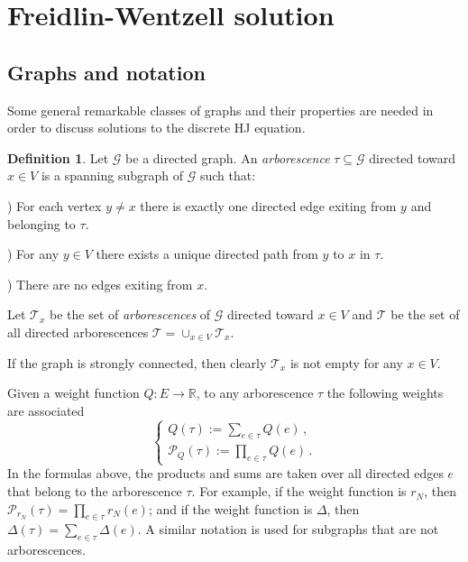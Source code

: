 \documentclass[reqno]{amsart}
\theoremstyle{plain}
\theoremstyle{definition}
\newtheorem{definition}[theorem]{Definition}
\theoremstyle{remark}
\numberwithin{equation}{section}
\numberwithin{theorem}{section}
\newcommand{\<}{\langle}
\renewcommand{\>}{\rangle}
\begin{document}
\section{Freidlin-Wentzell solution}

\subsection{Graphs and notation}

Some general remarkable classes of graphs and their properties are needed in order to discuss solutions to the discrete HJ equation. 

\begin{definition}\label{def-dir-ar}
	Let $\mathcal G$ be a directed graph. An \emph{arborescence} $\tau\subseteq \mathcal G$ directed toward $x\in V$ is a spanning subgraph of $\mathcal G$ such that:
	
	\smallskip
	
	) For each vertex $y\neq x$ there is exactly one directed edge exiting from $y$ and belonging to $\tau$.
	
	) For any $y\in V$ there exists a unique directed path from $y$ to $x$ in $\tau$.
	
	)  There are no edges exiting from $x$.
	
	\smallskip
	
	\noindent Let  $\mathcal T_x$ be the set of \emph{arborescences} of $\mathcal G$ directed toward $x\in V$ and $\mathcal T$ be the set of all directed arborescences $\mathcal T=\cup_{x\in V}\mathcal T_x$.
\end{definition}
If the graph is strongly connected, then clearly $\mathcal T_x$ is not empty for any $x\in V$.


\smallskip

Given a weight function $Q:E\to \mathbb R$, to any arborescence $\tau$ the following weights are associated
\begin{equation}
	\label{wfw}
	\left\{
	\begin{array}{l}
		Q(\tau):=\sum_{e\in \tau} Q(e)\,,\\
		\mathcal P_Q(\tau):=\prod_{e\in \tau} Q(e)\,.
	\end{array}
	\right.
\end{equation}
In the formulas above, the products and sums are taken over all directed edges $e$ that belong to the arborescence $\tau$. For example, if the weight function is $r_N$, then
$\mathcal P_{r_N}(\tau)=\prod_{e\in \tau} r_N(e)$; and if the weight function is $\Delta$, then
$\Delta(\tau)=\sum_{e\in \tau} \Delta(e)$. 
A similar notation is used for subgraphs that are not arborescences.
\end{document}

